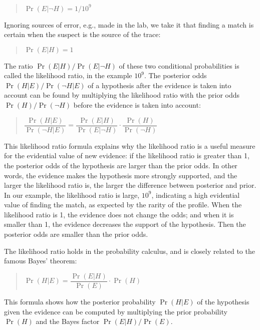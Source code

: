 \documentclass[10pt]{article}
\begin{document}
\begin{quotation}
	$\Pr(E|\neg H) = 1/10^9$
\end{quotation}

\noindent Ignoring sources of error, e.g., made in the lab, we take it that finding a match is certain when the suspect is the source of the trace:

\begin{quotation}
	$\Pr(E|H) = 1$
\end{quotation}

\noindent The ratio $\Pr(E|H)/\Pr(E|\neg H)$ of these two conditional probabilities is called the likelihood ratio, in the example $10^9$. The posterior odds ${\Pr(H|E)}/{\Pr(\neg H|E)}$ of a hypothesis after the evidence is taken into account can be found by multiplying the likelihood ratio with the prior odds ${\Pr(H)}/{\Pr(\neg H)}$ before the evidence is taken into account:

\begin{quotation}
	$
	\dfrac{\Pr(H|E)}{\Pr(\neg H|E)} = \dfrac{\Pr(E|H)}{\Pr(E| \neg H)}\cdot\dfrac{\Pr(H)}{\Pr(\neg H)}  
	$
\end{quotation}

\noindent This likelihood ratio formula explains why the likelihood ratio is a useful measure for the evidential value of new evidence: if the likelihood ratio is greater than 1, the posterior odds of the hypothesis are larger than the prior odds. In other words, the evidence makes the hypothesis more strongly supported, and the larger the likelihood ratio is, the larger the difference between posterior and prior. In our example, the likelihood ratio is large, $10^9$, indicating a high evidential value of finding the match, as expected by the rarity of the profile. When the likelihood ratio is 1, the evidence does not change the odds; and when it is smaller than 1, the evidence decreases the support of the hypothesis. Then the posterior odds are smaller than the prior odds.

The likelihood ratio holds in the probability calculus, and is closely related to the famous Bayes' theorem:

\begin{quotation}
	$\Pr(H|E) = \dfrac{\Pr(E|H)}{\Pr(E)}\cdot\Pr(H)$
\end{quotation}

\noindent This formula shows how the posterior probability $\Pr(H|E)$ of the hypothesis given the evidence can be computed by multiplying the prior probability $\Pr(H)$ and the Bayes factor $\Pr(E|H)/\Pr(E)$.
\end{document}
